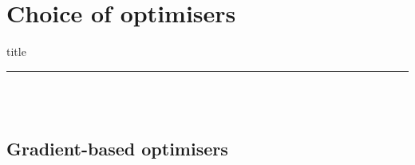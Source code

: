 \documentclass[aspectratio=169]{beamer}
\begin{document}
\section{Choice of optimisers}
\begin{frame}[plain]
    \centering
    \begin{beamercolorbox}[sep=8pt,center,shadow=true,rounded=true]{title}
    \insertsectionhead\par%
    \color{oxfordblue}\noindent\rule{10cm}{1pt} \\
    \LARGE{\faBalanceScale} \\
    \end{beamercolorbox}
\end{frame}

\subsection{Gradient-based optimisers}
\end{document}
